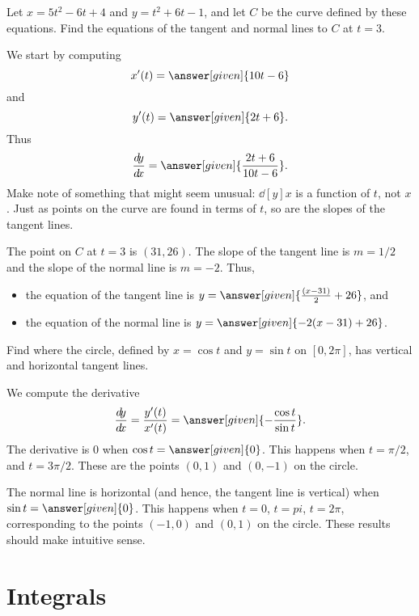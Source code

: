 \documentclass{ximera}
\begin{document}
\begin{example}
  Let $x=5t^2-6t+4$ and $y=t^2+6t-1$, and let $C$ be the curve defined
  by these equations. Find the equations of the tangent and normal lines
  to $C$ at $t=3$.
  \begin{explanation}
    We start by computing
    \[
    x'(t) = \answer[given]{10t-6}
    \]
    and
    \[
    y'(t) =\answer[given]{2t+6}.
    \]
    Thus
    \[
    \dd[y]{x} = \answer[given]{\frac{2t+6}{10t-6}}.
    \]
    Make note of something that might seem unusual: $\dd[y]{x}$ is a
    function of $t$, not $x$. Just as points on the curve are found in
    terms of $t$, so are the slopes of the tangent lines.
		
    The point on $C$ at $t=3$ is $(31,26)$. The slope of the tangent
    line is $m=1/2$ and the slope of the normal line is $m=-2$. Thus,
    \begin{itemize}
    \item the equation of the tangent line is
      $y=\answer[given]{\frac{(x-31)}{2}+26}$, and
    \item the equation of the normal line is
      $y=\answer[given]{-2(x-31)+26}$.
    \end{itemize}
  \end{explanation}
\end{example}


\begin{example}
  Find where the circle, defined by $x=\cos t$ and $y=\sin t$ on
  $[0,2\pi]$, has vertical and horizontal tangent lines.
  \begin{explanation}
    We compute the derivative 
    \[
    \dd[y]{x} = \frac{y'(t)}{x'(t)} = \answer[given]{-\frac{\cos t}{\sin t}}.
    \]
    The derivative is $0$ when $\cos t= \answer[given]{0}$. This
    happens when $t=\pi/2$, and $t= 3\pi/2$. These are the points
    $(0,1)$ and $(0,-1)$ on the circle.

    The normal line is horizontal (and hence, the tangent line is
    vertical) when $\sin t=\answer[given]{0}$. This happens when $t=
    0$, $t=pi$, $t=2\pi$, corresponding to the points $(-1,0)$ and
    $(0,1)$ on the circle. These results should make intuitive sense.
  \end{explanation}
\end{example}





\section{Integrals}
\end{document}
